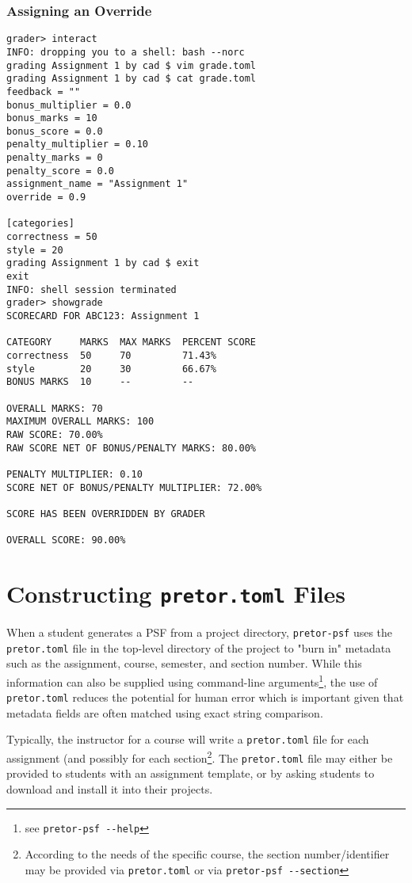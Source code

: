 \documentclass{book}
\begin{document}
\subsubsection{Assigning an Override}

\begin{verbatim}
grader> interact
INFO: dropping you to a shell: bash --norc
grading Assignment 1 by cad $ vim grade.toml
grading Assignment 1 by cad $ cat grade.toml
feedback = ""
bonus_multiplier = 0.0
bonus_marks = 10
bonus_score = 0.0
penalty_multiplier = 0.10
penalty_marks = 0
penalty_score = 0.0
assignment_name = "Assignment 1"
override = 0.9

[categories]
correctness = 50
style = 20
grading Assignment 1 by cad $ exit
exit
INFO: shell session terminated
grader> showgrade
SCORECARD FOR ABC123: Assignment 1

CATEGORY     MARKS  MAX MARKS  PERCENT SCORE
correctness  50     70         71.43%
style        20     30         66.67%
BONUS MARKS  10     --         --

OVERALL MARKS: 70
MAXIMUM OVERALL MARKS: 100
RAW SCORE: 70.00%
RAW SCORE NET OF BONUS/PENALTY MARKS: 80.00%

PENALTY MULTIPLIER: 0.10
SCORE NET OF BONUS/PENALTY MULTIPLIER: 72.00%

SCORE HAS BEEN OVERRIDDEN BY GRADER

OVERALL SCORE: 90.00%
\end{verbatim}

\section{Constructing \texttt{pretor.toml} Files} \label{sec:pretortoml}

When a student generates a PSF from a project directory, \texttt{pretor-psf}
uses the \texttt{pretor.toml} file in the top-level directory of the project to
"burn in" metadata such as the assignment, course, semester, and section
number. While this information can also be supplied using command-line
arguments\footnote{see \texttt{pretor-psf -{}-help}}, the use of
\texttt{pretor.toml} reduces the potential for human error which is important
given that metadata fields are often matched using exact string comparison.

Typically, the instructor for a course will write a \texttt{pretor.toml} file
for each assignment (and possibly for each section\footnote{According to the
needs of the specific course, the section number/identifier may be provided via
\texttt{pretor.toml} or via \texttt{pretor-psf -{}-section}}. The
\texttt{pretor.toml} file may either be provided to students with an assignment
template, or by asking students to download and install it into their projects.
\end{document}
